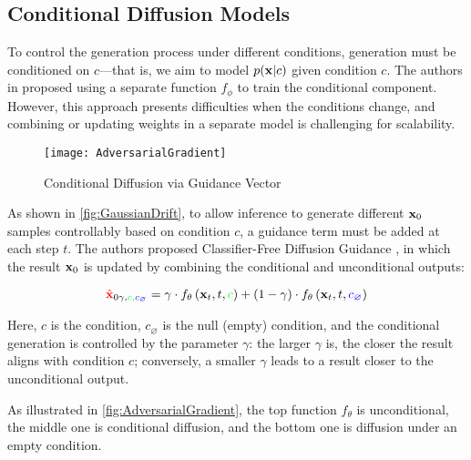 \subsection{Conditional Diffusion Models}
\label{subsec:DiffusionCondition}

To control the generation process under different conditions, generation must be conditioned on $c$—that is, we aim to model $p(\mathbf{x} | c)$ given condition $c$. The authors in \cite{dhariwal2021diffusion} proposed using a separate function $f_{\phi}$ to train the conditional component. However, this approach presents difficulties when the conditions change, and combining or updating weights in a separate model is challenging for scalability.

\begin{figure}[h]
	\captionsetup{skip=20pt}
	\texttt{[image: AdversarialGradient]}
	\caption{Conditional Diffusion via Guidance Vector}
	\label{fig:AdversarialGradient}
\end{figure}

As shown in \autoref{fig:GaussianDrift}, to allow inference to generate different $\mathbf{x}_0$ samples controllably based on condition $c$, a guidance term must be added at each step $t$. The authors proposed Classifier-Free Diffusion Guidance \cite{ho2022classifier}, in which the result $\mathbf{x}_0$ is updated by combining the conditional and unconditional outputs:

\begin{equation}
{\color{red}{\hat{\mathbf{x}}}}_{0 \gamma, \color{green}{c}, \color{blue}{c_{\varnothing}}}=\gamma \cdot f_{\theta} \left(\mathbf{x}_{t}, t, {\color{green}{c}} \right)+(1-\gamma) \cdot f_{\theta} \left(\mathbf{x}_{t}, t, {\color{blue}{c_{\varnothing}}} \right)
\end{equation}

Here, $c$ is the condition, $c_{\varnothing}$ is the null (empty) condition, and the conditional generation is controlled by the parameter $\gamma$: the larger $\gamma$ is, the closer the result aligns with condition $c$; conversely, a smaller $\gamma$ leads to a result closer to the unconditional output.

As illustrated in \autoref{fig:AdversarialGradient}, the top function $f_{\theta}$ is unconditional, the middle one is conditional diffusion, and the bottom one is diffusion under an empty condition.
